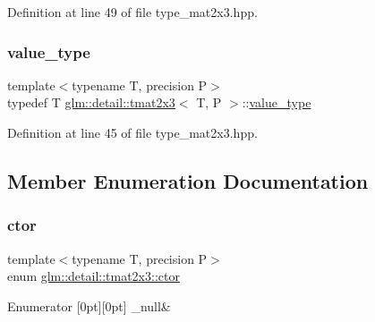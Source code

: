 Definition at line 49 of file type\+\_\+mat2x3.\+hpp.

\mbox{\label{structglm_1_1detail_1_1tmat2x3_a956bc7b781faea2cf8a47f9150e035f4}} 
\subsubsection{\texorpdfstring{value\+\_\+type}{value\_type}}
{\footnotesize\ttfamily template$<$typename T, precision P$>$ \\
typedef T \hyperlink{structglm_1_1detail_1_1tmat2x3}{glm\+::detail\+::tmat2x3}$<$ T, P $>$\+::\hyperlink{structglm_1_1detail_1_1tmat2x3_a956bc7b781faea2cf8a47f9150e035f4}{value\+\_\+type}}



Definition at line 45 of file type\+\_\+mat2x3.\+hpp.



\subsection{Member Enumeration Documentation}
\mbox{\label{structglm_1_1detail_1_1tmat2x3_ad7092896f5d4dad36473ed142687f571}} 
\subsubsection{\texorpdfstring{ctor}{ctor}}
{\footnotesize\ttfamily template$<$typename T, precision P$>$ \\
enum \hyperlink{structglm_1_1detail_1_1tmat2x3_ad7092896f5d4dad36473ed142687f571}{glm\+::detail\+::tmat2x3\+::ctor}}

\begin{DoxyEnumFields}{Enumerator}
[0pt][0pt]{}\mbox{\label{structglm_1_1detail_1_1tmat2x3_ad7092896f5d4dad36473ed142687f571adcd0a5de46b55f16016e91c37678b70c}} 
\+\_\+null&\\
\hline

\end{DoxyEnumFields}


